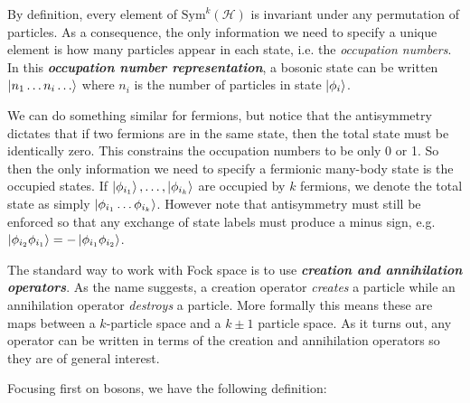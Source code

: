 \documentclass[onecolumn]{gwclass}
\renewcommand{\t}[1]{\text{#1}}
\begin{document}
By definition, every element of $\t{Sym}^k(\mathscr{H})$ is invariant under any permutation of particles. As a consequence, the only information we need to specify a unique element is how many particles appear in each state, i.e. the \emph{occupation numbers}. In this \textbf{\emph{occupation number representation}}, a bosonic state can be written $\ket{n_1\dots n_i\dots}$ where $n_i$ is the number of particles in state $\ket{\phi_i}$. 

We can do something similar for fermions, but notice that the antisymmetry dictates that if two fermions are in the same state, then the total state must be identically zero. This constrains the occupation numbers to be only 0 or 1. So then the only information we need to specify a fermionic many-body state is the occupied states. If $\ket{\phi_{i_1}},\dots,\ket{\phi_{i_k}}$ are occupied by $k$ fermions, we denote the total state as simply $\ket{\phi_{i_1}\dots \phi_{i_k}}$. However note that antisymmetry must still be enforced so that any exchange of state labels must produce a minus sign, e.g. $\ket{\phi_{i_2} \phi_{i_1}}=-\ket{ \phi_{i_1} \phi_{i_2}}$.

The standard way to work with Fock space is to use \textbf{\emph{creation and annihilation operators}}. As the name suggests, a creation operator \emph{creates} a particle while an annihilation operator \emph{destroys} a particle. More formally this means these are maps between a $k$-particle space and a $k\pm 1$ particle space. As it turns out, any operator can be written in terms of the creation and annihilation operators so they are of general interest. 

Focusing first on bosons, we have the following definition:
\end{document}
